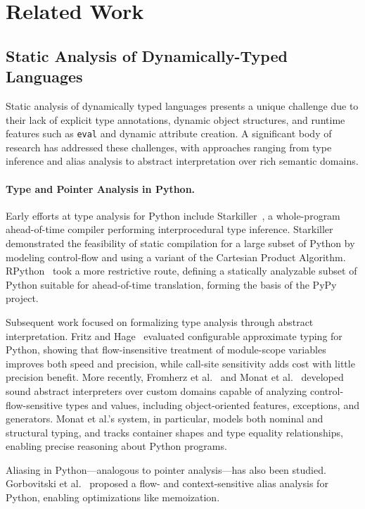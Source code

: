 \section{Related Work}
\label{sec:related}

\subsection{Static Analysis of Dynamically-Typed Languages}
Static analysis of dynamically typed languages presents a unique challenge due to their lack of explicit type annotations, dynamic object structures, and runtime features such as \texttt{eval} and dynamic attribute creation. A significant body of research has addressed these challenges, with approaches ranging from type inference and alias analysis to abstract interpretation over rich semantic domains.

\paragraph{Type and Pointer Analysis in Python.}
Early efforts at type analysis for Python include Starkiller~\cite{salib2004starkiller}, a whole-program ahead-of-time compiler performing interprocedural type inference. Starkiller demonstrated the feasibility of static compilation for a large subset of Python by modeling control-flow and using a variant of the Cartesian Product Algorithm. RPython~\cite{ancona2007rpython} took a more restrictive route, defining a statically analyzable subset of Python suitable for ahead-of-time translation, forming the basis of the PyPy project.

Subsequent work focused on formalizing type analysis through abstract interpretation. Fritz and Hage~\cite{fritz2017cost} evaluated configurable approximate typing for Python, showing that flow-insensitive treatment of module-scope variables improves both speed and precision, while call-site sensitivity adds cost with little precision benefit.
More recently, Fromherz et al.~\cite{fromherz2018static} and Monat et al.~\cite{monat2021static} developed sound abstract interpreters over custom domains capable of analyzing control-flow-sensitive types and values, including object-oriented features, exceptions, and generators. Monat et al.'s system, in particular, models both nominal and structural typing, and tracks container shapes and type equality relationships, enabling precise reasoning about Python programs.

Aliasing in Python---analogous to pointer analysis---has also been studied. Gorbovitski et al.~\cite{gorbovitski2010alias} proposed a flow- and context-sensitive alias analysis for Python, enabling optimizations like memoization.

